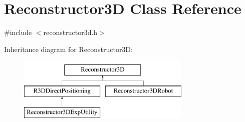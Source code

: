 \hypertarget{classReconstructor3D}{}\section{Reconstructor3D Class Reference}
\label{classReconstructor3D}


{\ttfamily \#include $<$reconstructor3d.\+h$>$}

Inheritance diagram for Reconstructor3D\+:\begin{figure}[H]
\begin{center}
\leavevmode
\includegraphics[height=3.000000cm]{classReconstructor3D}
\end{center}
\end{figure}
